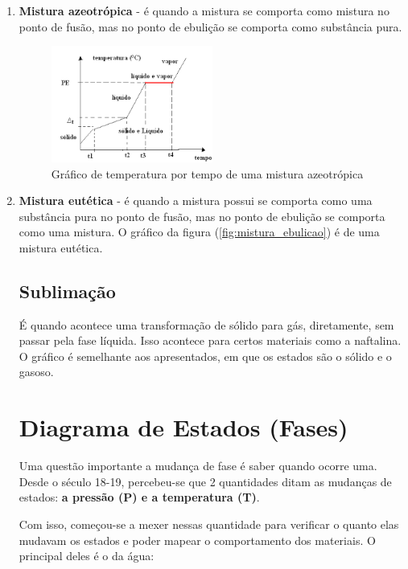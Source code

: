 \documentclass[12pt]{extarticle}
\newcommand{\<}{\langle}
\renewcommand{\>}{\rangle}
\theoremstyle{definition}
\begin{document}
\begin{enumerate}
    \item \textbf{Mistura azeotrópica} - é quando a mistura se comporta como mistura no ponto de fusão, mas no ponto de ebulição se comporta como substância pura.
    
    \begin{figure}[H]
        \centering
        \includegraphics[width=0.5\textwidth]{download.png}
        \caption{Gráfico de temperatura por tempo de uma mistura azeotrópica}
        \label{fig:azeotropic}
    \end{figure}
    
    \item \textbf{Mistura eutética} - é quando a mistura possui se comporta como uma substância pura no ponto de fusão, mas no ponto de ebulição se comporta como uma mistura. O gráfico da figura (\ref{fig:mistura_ebulicao}) é de uma mistura eutética.
    
    \subsection{Sublimação}
    
    É quando acontece uma transformação de sólido para gás, diretamente, sem passar pela fase líquida. Isso acontece para certos materiais como a naftalina. O gráfico é semelhante aos apresentados, em que os estados são o sólido e o gasoso.
    
    \section{Diagrama de Estados (Fases)}
    
    Uma questão importante a mudança de fase é saber quando ocorre uma. Desde o século 18-19, percebeu-se que 2 quantidades ditam as mudanças de estados: \textbf{a pressão (P) e a temperatura (T)}. 
    
    Com isso, começou-se a mexer nessas quantidade para verificar o quanto elas mudavam os estados e poder mapear o comportamento dos materiais. O principal deles é o da água:
    

\end{enumerate}
\end{document}
